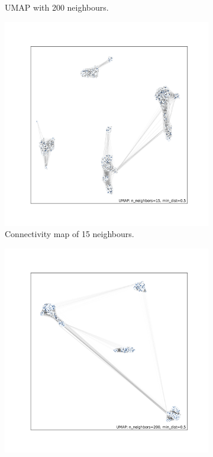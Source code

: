 \documentclass[12pt]{article}
\begin{document}
\begin{figure}[h!]
\begin{subfigure}[b]{0.49\linewidth}
    \caption{UMAP with 200 neighbours.}
    \label{fig:UMAP_high_NN_1KGP}
  \end{subfigure}
  \begin{subfigure}[b]{0.49\linewidth}
    \includegraphics[width=\linewidth]{code/images/UMAP_connectivity_low_NN.png}
    \caption{Connectivity map of 15 neighbours.}
    \label{fig:UMAP_low_NN_connectivity}
  \end{subfigure}
  \begin{subfigure}[b]{0.49\linewidth}
    \includegraphics[width=\linewidth]{code/images/UMAP_connectivity_high_NN.png}

\end{subfigure}
\end{figure}
\end{document}
